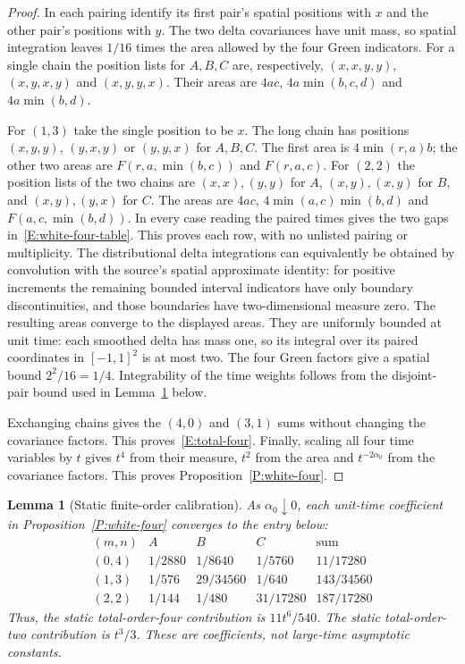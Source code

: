 \documentclass[12pt]{article}
\numberwithin{equation}{section}
\newtheorem{lemma}[theorem]{Lemma}
\theoremstyle{definition}
\begin{document}
\begin{proof}
  In each pairing identify its first pair's spatial positions with $x$
  and the other pair's positions with $y$. The two delta covariances
  have unit mass, so spatial integration leaves $1/16$ times the area
  allowed by the four Green indicators. For a single chain the position
  lists for $A,B,C$ are, respectively,
  $(x,x,y,y)$, $(x,y,x,y)$ and $(x,y,y,x)$.
  Their areas are $4ac$, $4a\min(b,c,d)$ and $4a\min(b,d)$.

  For $(1,3)$ take the single position to be $x$. The long chain has
  positions $(x,y,y)$, $(y,x,y)$ or $(y,y,x)$ for $A,B,C$.
  The first area is $4\min(r,a)b$; the other two areas are
  $F(r,a,\min(b,c))$ and $F(r,a,c)$. For $(2,2)$ the position lists
  of the two chains are $(x,x),(y,y)$ for $A$,
  $(x,y),(x,y)$ for $B$, and $(x,y),(y,x)$ for $C$.
  The areas are $4ac$, $4\min(a,c)\min(b,d)$ and
  $F(a,c,\min(b,d))$. In every case reading the paired times gives
  the two gaps in~\eqref{E:white-four-table}. This proves each row,
  with no unlisted pairing or multiplicity. The distributional delta
  integrations can equivalently be obtained by convolution with the
  source's spatial approximate identity: for positive increments the
  remaining bounded interval indicators have only boundary
  discontinuities, and those boundaries have two-dimensional measure
  zero. The resulting areas converge to the displayed areas. They are
  uniformly bounded at unit time: each smoothed delta has mass one,
  so its integral over its paired coordinates in $[-1,1]^2$ is at most
  two. The four Green factors give a spatial bound $2^2/16=1/4$.
  Integrability of the time weights follows from the disjoint-pair
  bound used in Lemma~\ref{L:static-four} below.

  Exchanging chains gives the $(4,0)$ and $(3,1)$ sums without changing
  the covariance factors. This proves~\eqref{E:total-four}. Finally,
  scaling all four time variables by $t$ gives $t^4$ from their measure,
  $t^2$ from the area and $t^{-2\alpha_0}$ from the covariance factors.
  This proves Proposition~\ref{P:white-four}.
\end{proof}

\begin{lemma}[Static finite-order calibration]\label{L:static-four}
  As $\alpha_0\downarrow0$, each unit-time coefficient in
  Proposition~\ref{P:white-four} converges to the entry below:
  \begin{equation}\label{E:static-four-table}
    \begin{array}{c|ccc|c}
      (m,n)&A&B&C&\text{sum}\\ \hline
      (0,4)&1/2880&1/8640&1/5760&11/17280\\
      (1,3)&1/576&29/34560&1/640&143/34560\\
      (2,2)&1/144&1/480&31/17280&187/17280
    \end{array}
  \end{equation}
  Thus, the static total-order-four contribution is $11t^6/540$.
  The static total-order-two contribution is $t^3/3$.
  These are coefficients, not large-time asymptotic constants.
\end{lemma}
\end{document}
